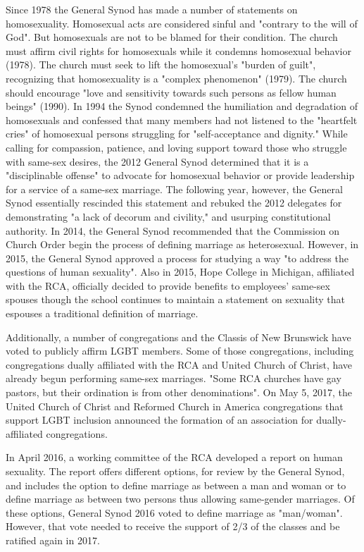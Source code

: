 Since 1978 the General Synod has made a number of statements on
homosexuality. Homosexual acts are considered sinful and "contrary to
the will of God". But homosexuals are not to be blamed for their
condition. The church must affirm civil rights for homosexuals while it
condemns homosexual behavior (1978). The church must seek to lift the
homosexual's "burden of guilt", recognizing that homosexuality is a
"complex phenomenon" (1979). The church should encourage "love and
sensitivity towards such persons as fellow human beings" (1990). In 1994
the Synod condemned the humiliation and degradation of homosexuals and
confessed that many members had not listened to the "heartfelt cries" of
homosexual persons struggling for "self-acceptance and dignity." While
calling for compassion, patience, and loving support toward those who
struggle with same-sex desires, the 2012 General Synod determined that
it is a "disciplinable offense" to advocate for homosexual behavior or
provide leadership for a service of a same-sex marriage. The following
year, however, the General Synod essentially rescinded this statement
and rebuked the 2012 delegates for demonstrating "a lack of decorum and
civility," and usurping constitutional authority. In 2014, the General
Synod recommended that the Commission on Church Order begin the process
of defining marriage as heterosexual. However, in 2015, the General
Synod approved a process for studying a way "to address the questions of
human sexuality". Also in 2015, Hope College in Michigan, affiliated
with the RCA, officially decided to provide benefits to employees'
same-sex spouses though the school continues to maintain a statement on
sexuality that espouses a traditional definition of marriage.

Additionally, a number of congregations and the Classis of New Brunswick
have voted to publicly affirm LGBT members. Some of those congregations,
including congregations dually affiliated with the RCA and United Church
of Christ, have already begun performing same-sex marriages. "Some RCA
churches have gay pastors, but their ordination is from other
denominations". On May 5, 2017, the United Church of Christ and Reformed
Church in America congregations that support LGBT inclusion announced
the formation of an association for dually-affiliated congregations.

In April 2016, a working committee of the RCA developed a report on
human sexuality. The report offers different options, for review by the
General Synod, and includes the option to define marriage as between a
man and woman or to define marriage as between two persons thus allowing
same-gender marriages. Of these options, General Synod 2016 voted to
define marriage as "man/woman". However, that vote needed to receive the
support of 2/3 of the classes and be ratified again in 2017.


